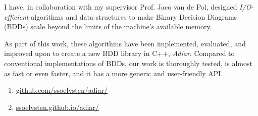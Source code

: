 
I have, in collaboration with my supervisor Prof. Jaco van de Pol, designed \emph{I/O-efficient}
algorithms and data structures to make Binary Decision Diagrams (BDDs) scale beyond the limits of
the machine's available memory.

\medskip

As part of this work, these algorithms have been implemented, evaluated, and improved upon to create
a new BDD library in C++, \emph{Adiar}. Compared to conventional implementations of BDDs, our work
is thoroughly tested, is almost as fast or even faster, and it has a more generic and user-friendly
API.

\medskip

\begin{enumerate}[leftmargin=2.5em]
\item[\indent\faGit] \href{https://github.com/ssoelvsten/adiar/}{github.com/ssoelvsten/adiar/}

\item[\indent\faFileTextO] \href{https://ssoelvsten.github.io/adiar/}{ssoelvsten.github.io/adiar/}
\end{enumerate}

\medskip
